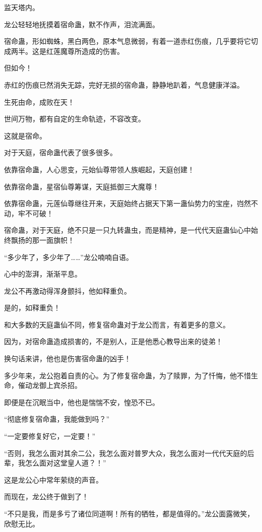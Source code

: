 
\begin{this_body}

监天塔内。

龙公轻轻地抚摸着宿命蛊，默不作声，泪流满面。

宿命蛊，形如蜘蛛，黑白两色，原本气息微弱，有着一道赤红伤痕，几乎要将它切成两半。这是红莲魔尊所造成的伤害。

但如今！

赤红的伤痕已然消失无踪，完好无损的宿命蛊，静静地趴着，气息健康洋溢。

生死由命，成败在天！

世间万物，都有自定的生命轨迹，不容改变。

这就是宿命。

对于天庭，宿命蛊代表了很多很多。

依靠宿命蛊，人心思变，元始仙尊带领人族崛起，天庭创建！

依靠宿命蛊，星宿仙尊筹谋，天庭抵御三大魔尊！

依靠宿命蛊，元莲仙尊继往开来，天庭始终占据天下第一蛊仙势力的宝座，岿然不动，牢不可破！

宿命蛊，对于天庭，绝不只是一只九转蛊虫，而是精神，是一代代天庭蛊仙心中始终飘扬的那一面旗帜！

“多少年了，多少年了……”龙公喃喃自语。

心中的澎湃，渐渐平息。

龙公不再激动得浑身颤抖，他如释重负。

是的，如释重负！

和大多数的天庭蛊仙不同，修复宿命蛊对于龙公而言，有着更多的意义。

因为，对宿命蛊造成损害的，不是别人，正是他悉心教导出来的徒弟！

换句话来讲，他也是伤害宿命蛊的凶手！

多少年来，龙公抱着自责的心。为了修复宿命蛊，为了赎罪，为了忏悔，他不惜生命，催动龙御上宾杀招。

即便是在沉眠当中，他也是惴惴不安，惶恐不已。

“彻底修复宿命蛊，我能做到吗？”

“一定要修复好它，一定要！”

“否则，我怎么面对其余二公，我怎么面对普罗大众，我怎么面对一代代天庭的后辈，我怎么面对这堂皇人道？！”

这是龙公心中常年萦绕的声音。

而现在，龙公终于做到了！

“不只是我，而是多亏了诸位同道啊！所有的牺牲，都是值得的。”龙公面露微笑，欣慰无比。


\end{this_body}

